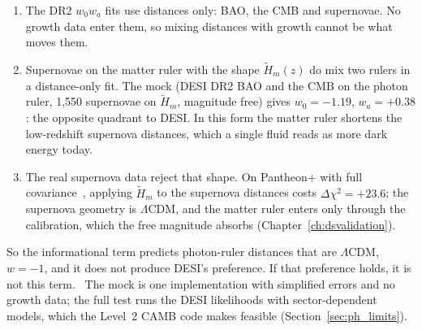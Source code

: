 \begin{enumerate}
\item The DR2 $w_0w_a$ fits use distances only: BAO, the CMB and supernovae. No growth data enter them, so mixing distances with growth cannot be what
moves them. \observed
\item Supernovae on the matter ruler with the shape $\tilde H_m(z)$ do mix two rulers in a distance-only fit. The mock (DESI DR2 BAO and the CMB on the
photon ruler, 1,550 supernovae on $\tilde H_m$, magnitude free) gives $w_0=-1.19$, $w_a=+0.38$: the opposite quadrant to DESI. In this form the
matter ruler shortens the low-redshift supernova distances, which a single fluid reads as more dark energy today. \calc
\item The real supernova data reject that shape. On Pantheon+ with full covariance~\cite{Brout2022}, applying $\tilde H_m$ to the supernova distances costs
$\Delta\chi^2=+23.6$; the supernova geometry is $\Lambda$CDM, and the matter ruler enters only through the calibration, which the free magnitude absorbs
(Chapter~\ref{ch:dsvalidation}). \calc
\end{enumerate}
So the informational term predicts photon-ruler distances that are $\Lambda$CDM, $w=-1$, and it does not produce DESI's preference. If that preference
holds, it is not this term. \prediction\ The mock is one implementation with simplified errors and no growth data; the full test runs the DESI
likelihoods with sector-dependent models, which the Level~2 CAMB code makes feasible (Section~\ref{sec:ph_limits}).

